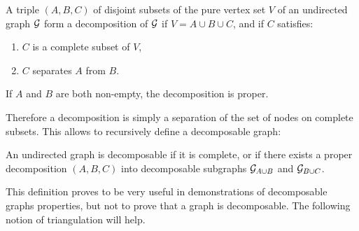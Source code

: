  \begin{definition}
 A triple $(A, B, C)$ of disjoint subsets of the pure vertex set $V$ of an undirected graph $\mathcal{G}$ form a decomposition of $\mathcal{G}$ if $V=A\cup B \cup C$, and if $C$ satisfies:
 \begin{enumerate}[label=(\roman*)]
 \item $C$ is a complete subset of  $V$,
 \item $C$ separates $A$ from $B$.
 \end{enumerate}
 If $A$ and $B$ are both non-empty, the decomposition is proper.
 \end{definition}
 
 Therefore a decomposition is simply a separation of the set of nodes on complete subsets. This allows to recursively define a decomposable graph:
 \begin{definition}
 An undirected graph is decomposable if it is complete, or if there exists a proper decomposition $(A, B, C)$ into decomposable subgraphs $\mathcal{G}_{A\cup B}$ and $\mathcal{G}_{B\cup C}$.
 \end{definition}
 This definition proves to be very useful in demonstrations of decomposable graphs properties, but not to prove that a graph is decomposable. The following notion of triangulation will help.
 
